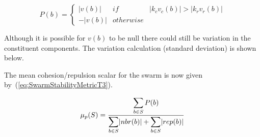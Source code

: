 \documentclass{ieeeaccess}
\begin{document}
\begin{equation}
\label{eq:CohesionRepulsion}
P(b) = \left\{\begin{array}{lll}
               |v(b)|& if & |k_cv_c(b)| > |k_r v_r(b)|\\
              -|v(b)|& otherwise
              \end{array}\right.
\end{equation}

Although it is possible for $v(b)$ to be null there could still be variation in the constituent components. The variation calculation (standard deviation) is shown below. 



The mean cohesion/repulsion scalar for the swarm is now given by~(\ref{eq:SwarmStabilityMetricT3}).  

\begin{equation}
\label{eq:SwarmStabilityMetricT3}
\mu_p(S) = \frac{\mathlarger{\sum_{b \in S} P(b)}}{\mathlarger{\sum_{b \in S}}|nbr(b)| + \mathlarger{\sum_{b \in S}}|rep(b)|}
\end{equation}

\end{document}
